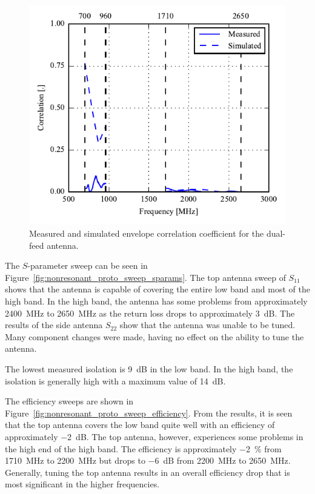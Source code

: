 \begin{figure}[htbp]
    \centering
    \includegraphics{img/tech_sol/nonresonant/prototype/correlation.pdf}
    \caption{Measured and simulated envelope correlation coefficient for the dual-feed antenna.}
    \label{fig:nonresonant_proto_ecc}
\end{figure}

\FloatBarrier
The $S$-parameter sweep can be seen in Figure~\ref{fig:nonresonant_proto_sweep_sparams}. The top antenna sweep of $S_{11}$ shows that the antenna is capable of covering the entire low band and most of the high band. In the high band, the antenna has some problems from approximately \SI{2400}{MHz} to \SI{2650}{MHz} as the return loss drops to approximately \SI{3}{dB}. The results of the side antenna $S_{22}$ show that the antenna was unable to be tuned. Many component changes were made, having no effect on the ability to tune the antenna. 

The lowest measured isolation is \SI{9}{dB} in the low band. In the high band, the isolation is generally high with a maximum value of \SI{14}{dB}. 

The efficiency sweeps are shown in Figure~\ref{fig:nonresonant_proto_sweep_efficiency}. From the results, it is seen that the top antenna covers the low band quite well with an efficiency of approximately \SI{-2}{dB}. The top antenna, however, experiences some problems in the high end of the high band. The efficiency is approximately \SI{-2}{\percent} from \SI{1710}{MHz} to \SI{2200}{MHz} but drops to \SI{-6}{dB} from \SI{2200}{MHz} to \SI{2650}{MHz}. Generally, tuning the top antenna results in an overall efficiency drop that is most significant in the higher frequencies.

